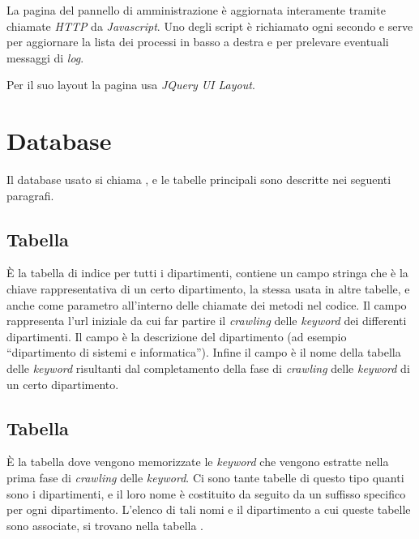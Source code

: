\documentclass[tesi.tex]{subfiles}
\begin{document}
La pagina del pannello di amministrazione \`e aggiornata interamente
tramite chiamate \emph{HTTP} da \emph{Javascript}. Uno degli script
\`e richiamato ogni secondo e serve per aggiornare la lista dei
processi in basso a destra e per prelevare eventuali messaggi di
\emph{log}.

Per il suo layout la pagina usa \emph{JQuery UI Layout}.

\section{Database}\label{sec:database}
Il database usato si chiama , e le tabelle principali
sono descritte nei seguenti paragrafi.

\subsection{Tabella }
\begin{center}
\end{center}
\`E la tabella di indice per tutti i dipartimenti, contiene un campo
stringa  che \`e la chiave rappresentativa di un certo
dipartimento, la stessa usata in altre tabelle, e anche come parametro
all'interno delle chiamate dei metodi nel codice. Il campo  rappresenta l'url iniziale da cui far partire
il \emph{crawling} delle \emph{keyword} dei differenti
dipartimenti. Il campo  \`e la descrizione del
dipartimento (ad esempio ``dipartimento di sistemi e informatica'').
Infine il campo  \`e il nome della tabella delle
\emph{keyword} risultanti dal completamento della fase di
\emph{crawling} delle \emph{keyword} di un certo
dipartimento.

\subsection{Tabella }\label{sec:tabkeyword}
\begin{center}
\end{center}
\`E la tabella dove vengono memorizzate le \emph{keyword} che vengono
estratte nella prima fase di \emph{crawling} delle \emph{keyword}. Ci
sono tante tabelle di questo tipo quanti sono i dipartimenti, e il
loro nome \`e costituito da  seguito da un suffisso
specifico per ogni dipartimento. L'elenco di tali nomi e il
dipartimento a cui queste tabelle sono associate, si trovano nella
tabella .
\end{document}
